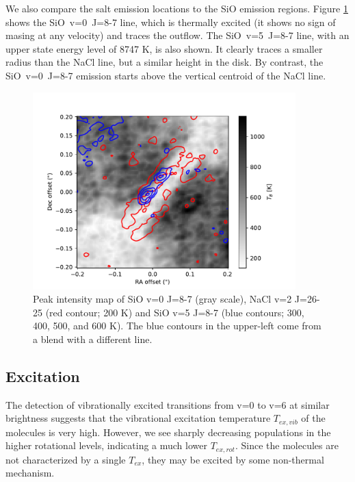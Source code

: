 \documentclass[twocolumn]{aastex62}
\begin{document}
We also compare the salt emission locations to the SiO emission regions.
Figure \ref{fig:sioonnacl} shows the \mbox{SiO v=0 J=8-7} line, which is thermally
excited (it shows no sign of masing at any velocity) and traces the outflow.
The \mbox{SiO v=5 J=8-7} line, with an upper state energy level of 8747 K, 
is also shown.  It clearly traces a smaller radius than the NaCl line, but
a similar height in the disk.  By contrast, the \mbox{SiO v=0 J=8-7} emission starts
above the vertical centroid of the NaCl line.


\begin{figure}[!htp]
\includegraphics[scale=1,width=4in]{figures/SiO_8-7_on_NaClv=2_26-25.pdf}
\caption{Peak intensity map of SiO v=0 J=8-7 (gray scale), NaCl v=2 J=26-25
(red contour; 200 K) and {SiO v=5 J=8-7} (blue contours; 300, 400, 500, and 600 K).  The blue
contours in the upper-left come from a blend with a different line.
}
\label{fig:sioonnacl}
\end{figure}



\subsection{Excitation}
The detection of vibrationally excited transitions from v=0 to v=6 at similar brightness
suggests that the vibrational excitation temperature $T_{ex,vib}$ of the molecules
is very high.  However, we see sharply decreasing populations in the higher
rotational levels, indicating a much lower $T_{ex,rot}$.  Since the molecules are
not characterized by a single $T_{ex}$, they may be excited by some
non-thermal mechanism.
\end{document}
